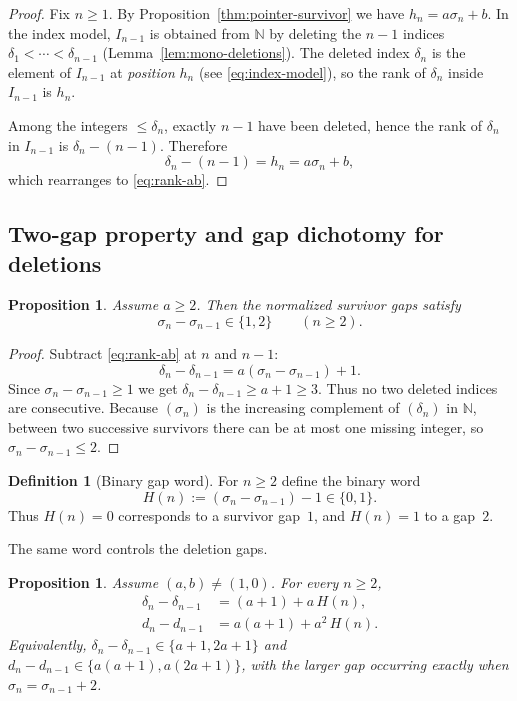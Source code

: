 \documentclass[11pt]{article}
\numberwithin{equation}{section}
\theoremstyle{plain}
\newtheorem{proposition}[theorem]{Proposition}
\theoremstyle{definition}
\newtheorem{definition}[theorem]{Definition}
\theoremstyle{remark}
\newcommand{\N}{\mathbb{N}}
\begin{document}
\begin{proof}
Fix $n\ge1$. By Proposition~\ref{thm:pointer-survivor} we have
$h_n=a\sigma_n+b$. In the index model, $I_{n-1}$ is obtained from $\N$ by
deleting the $n-1$ indices $\delta_1<\cdots<\delta_{n-1}$
(Lemma~\ref{lem:mono-deletions}).
The deleted index $\delta_n$ is the element of $I_{n-1}$ at \emph{position}
$h_n$ (see \eqref{eq:index-model}), so the rank of $\delta_n$ inside
$I_{n-1}$ is $h_n$.

Among the integers $\le \delta_n$, exactly $n-1$ have been deleted, hence
the rank of $\delta_n$ in $I_{n-1}$ is $\delta_n-(n-1)$. Therefore
\[
  \delta_n-(n-1)=h_n=a\sigma_n+b,
\]
which rearranges to \eqref{eq:rank-ab}.
\end{proof}

\subsection{Two-gap property and gap dichotomy for deletions}

\begin{proposition}\label{thm:two-gap}
Assume $a\ge2$. Then the normalized survivor gaps satisfy
\[
  \sigma_n-\sigma_{n-1}\in\{1,2\}\qquad (n\ge2).
\]
\end{proposition}

\begin{proof}
Subtract \eqref{eq:rank-ab} at $n$ and $n-1$:
\[
  \delta_n-\delta_{n-1}
  = a(\sigma_n-\sigma_{n-1})+1.
\]
Since $\sigma_n-\sigma_{n-1}\ge1$ we get $\delta_n-\delta_{n-1}\ge a+1\ge3$.
Thus no two deleted indices are consecutive.
Because $(\sigma_n)$ is the increasing complement of $(\delta_n)$ in $\N$,
between two successive survivors there can be at most one missing integer,
so $\sigma_n-\sigma_{n-1}\le2$.
\end{proof}

\begin{definition}[Binary gap word]\label{def:gapword-H}
For $n\ge2$ define the binary word
\begin{equation}\label{eq:H-def}
  H(n):=(\sigma_n-\sigma_{n-1})-1\in\{0,1\}.
\end{equation}
Thus $H(n)=0$ corresponds to a survivor gap~$1$, and $H(n)=1$ to a gap~$2$.
\end{definition}

The same word controls the deletion gaps.

\begin{proposition}\label{prop:del-gaps-H}
Assume $(a,b)\neq(1,0)$. For every $n\ge2$,
\begin{align}
  \delta_n-\delta_{n-1} &= (a+1)+a\,H(n), \label{eq:delta-gaps-H}\\
  d_n-d_{n-1} &= a(a+1)+a^2\,H(n). \label{eq:d-gaps-H}
\end{align}
Equivalently, $\delta_n-\delta_{n-1}\in\{a+1,2a+1\}$ and
$d_n-d_{n-1}\in\{a(a+1),a(2a+1)\}$, with the larger gap occurring
exactly when $\sigma_n=\sigma_{n-1}+2$.
\end{proposition}
\end{document}
